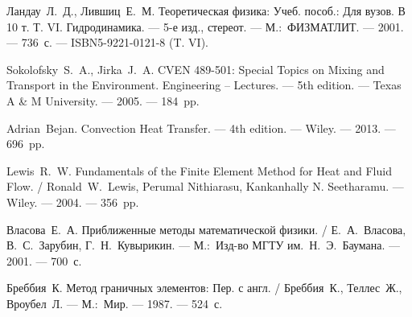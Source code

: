 \begin{thebibliography}
Ландау~Л.~Д., Лившиц~Е.~М. Теоретическая физика: Учеб. пособ.: Для вузов. В 10 т. Т. VI. Гидродинамика. --- 5-е изд., стереот. --- М.:~ФИЗМАТЛИТ. --- 2001. --- 736~с. --- ISBN5-9221-0121-8 (T. VI).

Sokolofsky~S.~A., Jirka~J.~A. CVEN 489-501: Special Topics on Mixing and Transport in the Environment. Engineering -- Lectures. --- 5th edition. --- Texas A \& M University. --- 2005. --- 184~pp.

Adrian~Bejan. Convection Heat Transfer. --- 4th edition. --- Wiley. --- 2013. --- 696~pp.

Lewis~R.~W. Fundamentals of the Finite Element Method for Heat and Fluid Flow. / Ronald~W.~Lewis, Perumal Nithiarasu, Kankanhally N. Seetharamu. --- Wiley. --- 2004. --- 356~pp.

Власова~Е.~А. Приближенные методы математической физики. / Е.~А.~Власова, В.~С.~Зарубин, Г.~Н.~Кувырикин. --- М.:~Изд-во МГТУ им.~Н.~Э.~Баумана. --- 2001. --- 700~с.

Бреббия~К. Метод граничных элементов: Пер. с англ. / Бреббия~К., Теллес~Ж., Вроубел~Л. --- М.:~Мир. --- 1987. --- 524~с.

\end{thebibliography}
